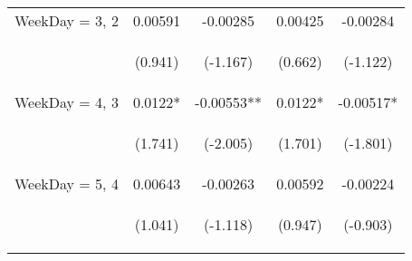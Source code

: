 \documentclass[]{standalone}
\begin{document}
\begin{tabular}{lcccc}
    WeekDay = 3, 2   & 0.00591                                        & -0.00285                                       & 0.00425                                        & -0.00284                                       \\
    \vspace{4pt}     & \begin{footnotesize}(0.941)\end{footnotesize}  & \begin{footnotesize}(-1.167)\end{footnotesize} & \begin{footnotesize}(0.662)\end{footnotesize}  & \begin{footnotesize}(-1.122)\end{footnotesize} \\
    WeekDay = 4, 3   & 0.0122*                                        & -0.00553**                                     & 0.0122*                                        & -0.00517*                                      \\
    \vspace{4pt}     & \begin{footnotesize}(1.741)\end{footnotesize}  & \begin{footnotesize}(-2.005)\end{footnotesize} & \begin{footnotesize}(1.701)\end{footnotesize}  & \begin{footnotesize}(-1.801)\end{footnotesize} \\
    WeekDay = 5, 4   & 0.00643                                        & -0.00263                                       & 0.00592                                        & -0.00224                                       \\
    \vspace{4pt}     & \begin{footnotesize}(1.041)\end{footnotesize}  & \begin{footnotesize}(-1.118)\end{footnotesize} & \begin{footnotesize}(0.947)\end{footnotesize}  & \begin{footnotesize}(-0.903)\end{footnotesize} \\

\end{tabular}
\end{document}
